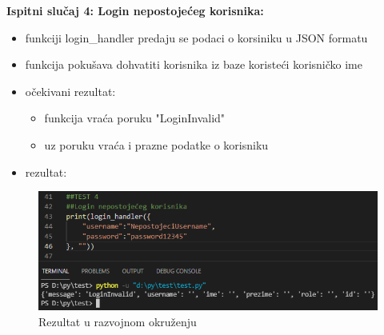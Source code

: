 		\textbf{Ispitni slučaj 4: Login nepostojećeg korisnika:}\\
\begin{itemize}
	\item funkciji login\_handler predaju se podaci o korsiniku u JSON formatu
	\item funkcija pokušava dohvatiti korisnika iz baze koristeći korisničko ime
	
	\item očekivani rezultat:\\
	\begin{itemize}
		\item funkcija vraća poruku "LoginInvalid" 
		\item uz poruku vraća i prazne podatke o korisniku
	\end{itemize}
	\item rezultat:
\end{itemize}
\begin{figure}[H]
	\centering
	\includegraphics[scale=0.5]{./slike/rez4.png}
	\caption{Rezultat u razvojnom okruženju}
	\label{fig:REZ4}
\end{figure}


